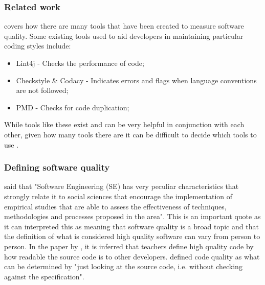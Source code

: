 \subsubsection{Related work}

\cite{8681007} covers how there are many tools that have been created to measure software quality. Some existing tools used to aid developers in maintaining particular coding styles include:
\begin{itemize}
	\item Lint4j - Checks the performance of code;
	\item Checkstyle \& Codacy - Indicates errors and flags when language conventions are not followed;
	\item PMD - Checks for code duplication;
\end{itemize}
While tools like these exist and can be very helpful in conjunction with each other, given how many tools there are it can be difficult to decide which tools to use \citep{6606742}.

\subsubsection{Defining software quality}
\cite{6606742} said that "Software Engineering (SE) has very peculiar characteristics that strongly relate it to social sciences that encourage the implementation of empirical studies that are able to assess the effectiveness of techniques, methodologies and processes proposed in the area". This is an important quote as it can interpreted this as meaning that software quality is a broad topic and that the definition of what is considered high quality software can vary from person to person. In the paper by \cite{10.1145/3428029.3428047}, it is inferred that teachers define high quality code by how readable the source code is to other developers. \cite{10.1145/3428029.3428047, 10.1145/2674683.2674702} defined code quality as what can be determined by "just looking at the source code, i.e. without checking against the specification".
